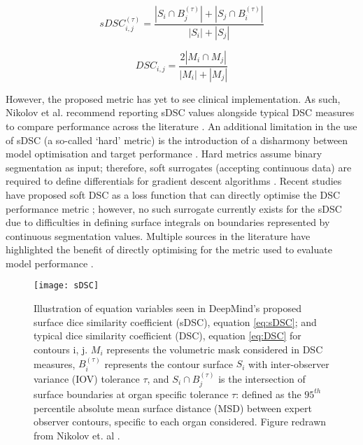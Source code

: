 \begin{equation}
sDSC_{i,j}^{(\tau)} = \frac{|S_{i} \cap B_{j}^{(\tau)}| + |S_{j} \cap B_{i}^{(\tau)}|}{|S_{i}| + |S_{j}|}
\label{eq:sDSC}
\end{equation}

\begin{equation}
DSC_{i,j} = \frac{2|M_{i} \cap M_{j}|}{|M_{i}| + |M_{j}|}
\label{eq:DSC}
\end{equation}

However, the proposed metric has yet to see clinical implementation. As such, Nikolov et al. recommend reporting sDSC values alongside typical DSC measures to compare performance across the literature \cite{Nikolov_2018}. An additional limitation in the use of sDSC (a so-called `hard' metric) is the introduction of a disharmony between model optimisation and target performance \cite{Bertels2019}. Hard metrics assume binary segmentation as input; therefore, soft surrogates (accepting continuous data) are required to define differentials for gradient descent algorithms \cite{Bertels2019}. Recent studies have proposed soft DSC as a loss function that can directly optimise the DSC performance metric \cite{Bertels2019}; however, no such surrogate currently exists for the sDSC due to difficulties in defining surface integrals on boundaries represented by continuous segmentation values. Multiple sources in the literature have highlighted the benefit of directly optimising for the metric used to evaluate model performance \cite{Bertels2019, Vapnik2000}.

\begin{figure}
	\begin{center}
		\texttt{[image: sDSC]}
		\caption{Illustration of equation variables seen in DeepMind's proposed surface dice similarity coefficient (sDSC), equation \ref{eq:sDSC}; and typical dice similarity coefficient (DSC), equation \ref{eq:DSC} for contours i, j. $M_{i}$ represents the volumetric mask considered in DSC measures, $B_{i}^{(\tau)}$ represents the contour surface $S_{i}$ with inter-observer variance (IOV) tolerance $\tau$, and $S_{i} \cap B_{j}^{(\tau)}$ is the intersection of surface boundaries at organ specific tolerance $\tau$: defined as the $95^{th}$ percentile absolute mean surface distance (MSD) between expert observer contours, specific to each organ considered. Figure redrawn from Nikolov et. al \cite{Nikolov_2018}.}
		\label{fig:sDSC}
	\end{center}
\end{figure}

